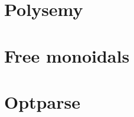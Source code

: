 \documentclass[10pt]{beamer}
\begin{document}
\section{Polysemy}


\section{Free monoidals}


\section{Optparse}


% 
% 
\end{document}
